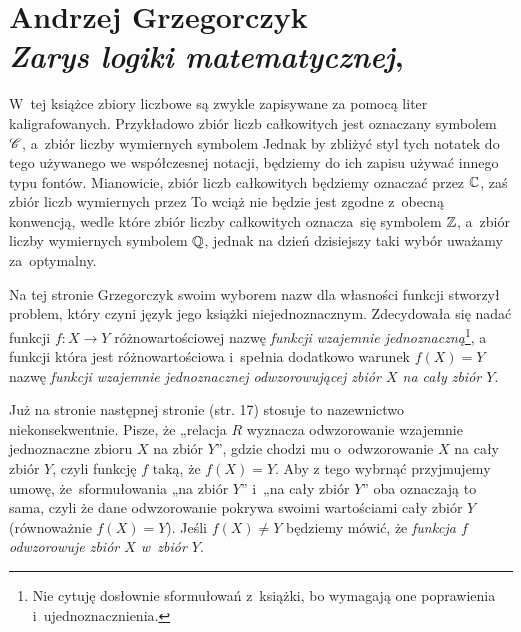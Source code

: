 \documentclass[a4paper,11pt]{article}
\numberwithin{equation}{section}
\begin{document}
\VerSpaceSix












\newpage
\section{Andrzej Grzegorczyk \\
  \textit{Zarys logiki matematycznej},
  \cite{Grzegorczyk-Zarys-Logiki-Matematycznej-Wyd-1975}}

\VerSpaceTwo




\noindent
W~tej książce zbiory liczbowe są zwykle zapisywane za pomocą liter
kaligrafowanych. Przykładowo zbiór liczb całkowitych jest oznaczany symbolem
$\mathcal{C}$, a~zbiór liczby wymiernych symbolem %
Jednak by zbliżyć styl tych notatek do tego używanego we współczesnej
notacji, będziemy do ich zapisu używać innego typu fontów. Mianowicie,
zbiór liczb całkowitych będziemy oznaczać przez $\mathbb{C}$, zaś zbiór liczb
wymiernych przez %
To wciąż nie będzie jest zgodne z~obecną konwencją, wedle które zbiór liczby
całkowitych oznacza~się symbolem $\mathbb{Z}$, a~zbiór liczby wymiernych symbolem
$\mathbb{Q}$, jednak na dzień dzisiejszy taki wybór uważamy za~optymalny.

\VerSpaceTwo






\noindent
{} Na tej stronie Grzegorczyk swoim wyborem nazw dla
własności funkcji stworzył problem, który czyni język jego książki
niejednoznacznym. Zdecydowała się nadać funkcji $f : X \to Y$
różnowartościowej nazwę \textit{funkcji wzajemnie
  jednoznaczną}\footnote{Nie cytuję dosłownie sformułowań z~książki,
  bo wymagają one poprawienia i~ujednoznacznienia.}, a funkcji która
jest różnowartościowa i~spełnia dodatkowo warunek $f( X ) = Y$ nazwę
\textit{funkcji wzajemnie jednoznacznej odwzorowującej zbiór $X$ na cały
  zbiór $Y$}.

Już na stronie następnej stronie (str. 17) stosuje to nazewnictwo
niekonsekwentnie. Pisze, że „relacja $R$ wyznacza odwzorowanie
wzajemnie jednoznaczne zbioru $X$ na zbiór $Y$”, gdzie chodzi mu
o~odwzorowanie $X$ na cały zbiór $Y$, czyli funkcję $f$ taką, że
$f( X ) = Y$. Aby z tego wybrnąć przyjmujemy umowę, że~sformułowania
„na zbiór $Y$” i~„na cały zbiór $Y$” oba oznaczają to sama, czyli że
dane odwzorowanie pokrywa swoimi wartościami cały zbiór $Y$
(równoważnie $f( X ) = Y$). Jeśli $f( X ) \neq Y$ będziemy mówić, że
\textit{funkcja $f$ odwzorowuje zbiór $X$ w~zbiór $Y$}.
\end{document}
